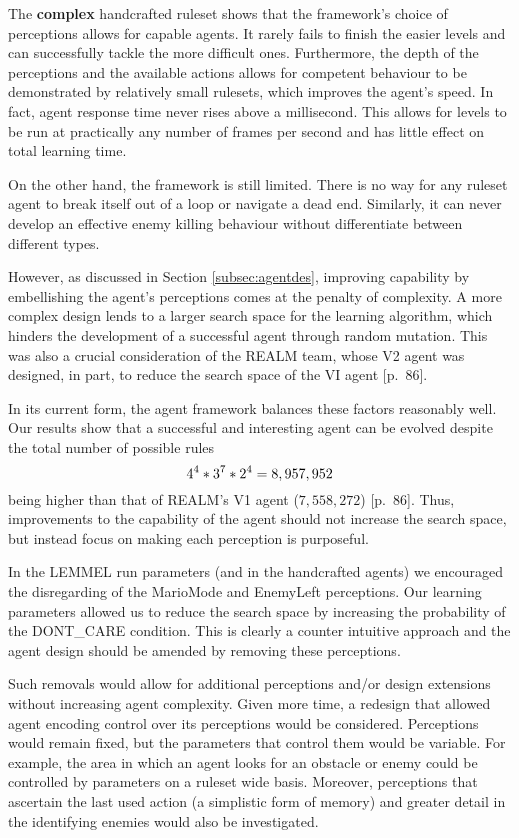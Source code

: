 The \textbf{complex} handcrafted ruleset shows that the framework's choice of perceptions allows for capable agents. It rarely fails to finish the easier levels and can successfully tackle the more difficult ones. Furthermore, the depth of the perceptions and the available actions allows for competent behaviour to be demonstrated by relatively small rulesets, which improves the agent's speed. In fact, agent response time never rises above a millisecond. This allows for levels to be run at practically any number of frames per second and has little effect on total learning time.

On the other hand, the framework is still limited. There is no way for any ruleset agent to break itself out of a loop or navigate a dead end. Similarly, it can never develop an effective enemy killing behaviour without differentiate between different types.

However, as discussed in Section \ref{subsec:agentdes}, improving capability by embellishing the agent's perceptions comes at the penalty of complexity. A more complex design lends to a larger search space for the learning algorithm, which hinders the development of a successful agent through random mutation. This was also a crucial consideration of the REALM team, whose V2 agent was designed, in part, to reduce the search space of the VI agent \cite{realm}[p.~86].

In its current form, the agent framework balances these factors reasonably well. Our results show that a successful and interesting agent can be evolved despite the total number of possible rules
\[ \centering
4^4 * 3^7 * 2^4 = 8,957,952
\]
being higher than that of REALM's V1 agent ($7,558,272$) \cite{realm}[p.~86]. Thus, improvements to the capability of the agent should not increase the search space, but instead focus on making each perception is purposeful.

In the LEMMEL run parameters (and in the handcrafted agents) we encouraged the disregarding of the MarioMode and EnemyLeft perceptions. Our learning parameters allowed us to reduce the search space by increasing the probability of the {\footnotesize DONT\_CARE} condition. This is clearly a counter intuitive approach and the agent design should be amended by removing these perceptions. 

Such removals would allow for additional perceptions and/or design extensions without increasing agent complexity. Given more time, a redesign that allowed agent encoding control over its perceptions would be considered. Perceptions would remain fixed, but the parameters that control them would be variable. For example, the area in which an agent looks for an obstacle or enemy could be controlled by parameters on a ruleset wide basis. Moreover, perceptions that ascertain the last used action (a simplistic form of memory) and greater detail in the identifying enemies would also be investigated.


